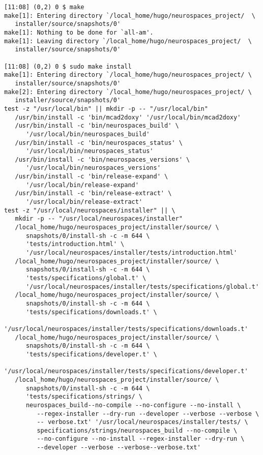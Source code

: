 \documentclass[12pt]{article}
\begin{document}
\begin{itemize}
\begin{enumerate}
\begin{verbatim}
[11:08] (0,2) 0 $ make
make[1]: Entering directory `/local_home/hugo/neurospaces_project/  \
   installer/source/snapshots/0'
make[1]: Nothing to be done for `all-am'.
make[1]: Leaving directory `/local_home/hugo/neurospaces_project/  \
   installer/source/snapshots/0'

[11:08] (0,2) 0 $ sudo make install
make[1]: Entering directory `/local_home/hugo/neurospaces_project/ \
   installer/source/snapshots/0'
make[2]: Entering directory `/local_home/hugo/neurospaces_project/ \
   installer/source/snapshots/0'
test -z "/usr/local/bin" || mkdir -p -- "/usr/local/bin"
   /usr/bin/install -c 'bin/mcad2doxy' '/usr/local/bin/mcad2doxy'
   /usr/bin/install -c 'bin/neurospaces_build' \
      '/usr/local/bin/neurospaces_build'
   /usr/bin/install -c 'bin/neurospaces_status' \
      '/usr/local/bin/neurospaces_status'
   /usr/bin/install -c 'bin/neurospaces_versions' \
      '/usr/local/bin/neurospaces_versions'
   /usr/bin/install -c 'bin/release-expand' \
      '/usr/local/bin/release-expand'
   /usr/bin/install -c 'bin/release-extract' \
      '/usr/local/bin/release-extract'
test -z "/usr/local/neurospaces/installer" || \
   mkdir -p -- "/usr/local/neurospaces/installer"
   /local_home/hugo/neurospaces_project/installer/source/ \
      snapshots/0/install-sh -c -m 644 \
      'tests/introduction.html' \
      '/usr/local/neurospaces/installer/tests/introduction.html'
   /local_home/hugo/neurospaces_project/installer/source/ \
      snapshots/0/install-sh -c -m 644 \
      'tests/specifications/global.t' \
      '/usr/local/neurospaces/installer/tests/specifications/global.t'
   /local_home/hugo/neurospaces_project/installer/source/ \
      snapshots/0/install-sh -c -m 644 \
      'tests/specifications/downloads.t' \
      '/usr/local/neurospaces/installer/tests/specifications/downloads.t'
   /local_home/hugo/neurospaces_project/installer/source/ \
      snapshots/0/install-sh -c -m 644 \
      'tests/specifications/developer.t' \
      '/usr/local/neurospaces/installer/tests/specifications/developer.t'
   /local_home/hugo/neurospaces_project/installer/source/ \
      snapshots/0/install-sh -c -m 644 \
      'tests/specifications/strings/ \
      neurospaces_build--no-compile --no-configure --no-install \
         --regex-installer --dry-run --developer --verbose --verbose \
         -- verbose.txt' '/usr/local/neurospaces/installer/tests/ \
         specifications/strings/neurospaces_build --no-compile \
         --no-configure --no-install --regex-installer --dry-run \
         --developer --verbose --verbose--verbose.txt'

\end{verbatim}
\end{enumerate}
\end{itemize}
\end{document}
